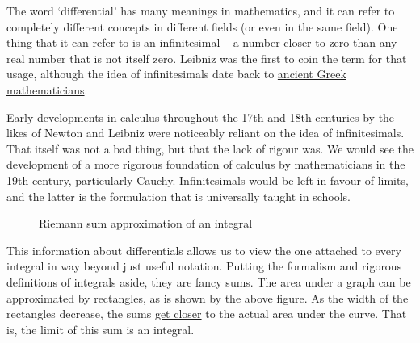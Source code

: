 \documentclass[a4paper,12pt]{article}
\begin{document}
The word `differential' has many meanings in mathematics, and it can refer to completely different concepts in different fields (or even in the same field).
One thing that it can refer to is an infinitesimal -- a number closer to zero than any real number that is not itself zero.
Leibniz was the first to coin the term for that usage, although the idea of infinitesimals date back to \href{https://plato.stanford.edu/entries/continuity/}{ancient Greek mathematicians}.

Early developments in calculus throughout the 17th and 18th centuries by the likes of Newton and Leibniz were noticeably reliant on the idea of infinitesimals.
That itself was not a bad thing, but that the lack of rigour was.
We would see the development of a more rigorous foundation of calculus by mathematicians in the 19th century, particularly Cauchy.
Infinitesimals would be left in favour of limits, and the latter is the formulation that is universally taught in schools.

\begin{figure}[!htbp]
\centering
{}
\caption{Riemann sum approximation of an integral}
\label{fig:riemann_sum}
\end{figure}

This information about differentials allows us to view the one attached to every integral in way beyond just useful notation.
Putting the formalism and rigorous definitions of integrals aside, they are fancy sums.
The area under a graph can be approximated by rectangles, as is shown by the above figure.
As the width of the rectangles decrease, the sums \href{https://commons.wikimedia.org/wiki/File:Riemann_sum_(leftbox).gif}{get closer} to the actual area under the curve.
That is, the limit of this sum is an integral.
\end{document}
